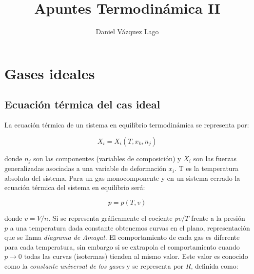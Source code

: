 \documentclass[12pt,a4paper,oneside]{book}
\author{Daniel Vázquez Lago}
\title{Apuntes Termodinámica II}
\begin{document}
\newcommand{\parentesis}[1]{\left( #1  \right)}
\newcommand{\parciales}[2]{\frac{\partial #1}{\partial #2}}
\newcommand{\pparciales}[2]{\parentesis{\parciales{#1}{#2}}}
\newcommand{\D}{\mathrm{d}}
\newcommand{\corchetes}[1]{\left{ #1  \right} }
\newcommand{\ccorchetes}[1]{\left[ #1  \right]}
\newcommand{\cte}{\mathrm{cte}}
\newcommand{\tquad}{\quad \quad \quad}
\newcommand{\Jn}{\textbf{J}}
\newcommand{\Fn}{\textbf{F}}
\newcommand{\Omegan}{\mathbf{\Omega}}
\newcommand{\divergencia}{\nabla \cdot}
\newcommand{\rotacional}{\nabla \times}
\renewcommand{\div}{\nabla \cdot}
\newcommand{\logn}{\mathrm{ln} \ }
\newcommand{\rot}{\nabla \times}
\newcommand{\grad}{\nabla }
\newcommand{\inti}{\int_{-\infty}^{\infty}}
\newcommand{\into}{\int_{0}^{\infty}}
\newcommand{\muJK}{\mu_{JK}}


\maketitle

\newpage

\tableofcontents

\newpage

\chapter{Gases ideales}

\section{Ecuación térmica del cas ideal}


La ecuación térmica de un sistema en equilibrio termodinámica se representa por:

\begin{equation}
X_i = X_i (T,x_k,n_j)
\end{equation}

donde $n_j$ son las componentes (variables de composición) y $X_i$ son las fuerzas generalizadas asociadas a una variable de deformación $x_i$. T es la temperatura absoluta del sistema. Para un gas monocomponente y en un sistema cerrado la ecuación térmica del sistema en equilibrio será:

\begin{equation}
p = p(T,v)
\end{equation}

donde $v=V/n$. Si se representa gráficamente el cociente $pv/T$ frente a la presión $p$ a una temperatura dada constante obtenemos curvas en el plano, representación que se llama \textit{diagrama de Amagat}. El comportamiento de cada gas es diferente para cada temperatura, sin embargo si se extrapola el comportamiento cuando $p \rightarrow 0$ todas las curvas (isotermas) tienden al mismo valor. Este valor es conocido como la \textit{constante universal de los gases} y se representa por $R$, definida como:
\end{document}
